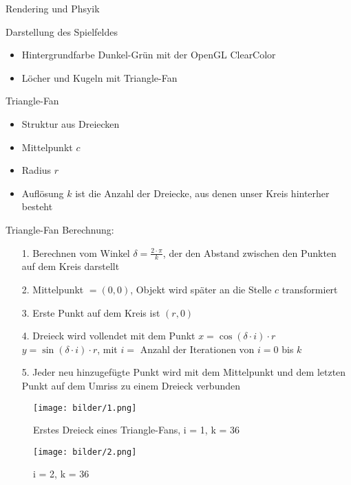 \begin{frame}{Rendering und Phsyik}
\end{frame}
\begin{frame}{Darstellung des Spielfeldes}
\begin{itemize}
	\item Hintergrundfarbe Dunkel-Grün mit der OpenGL ClearColor
	\item Löcher und Kugeln mit Triangle-Fan
\end{itemize}
\end{frame}
\begin{frame}{Triangle-Fan}
\begin{itemize}
	\item Struktur aus Dreiecken
	\item Mittelpunkt $c$
	\item Radius $r$
	\item Auflösung $k$ ist die Anzahl der Dreiecke, aus denen unser Kreis hinterher besteht
\end{itemize}
\end{frame}
\begin{frame}{Triangle-Fan}
Berechnung:
\begin{itemize}
	\item [1.] Berechnen vom Winkel $\delta = \frac{2 \cdot \pi}{k}$, der den Abstand zwischen den Punkten auf dem Kreis darstellt
	\item [2.] Mittelpunkt $= (0,0)$, Objekt wird später an die Stelle $c$ transformiert
	\item [3.] Erste Punkt auf dem Kreis ist $(r,0)$
	\item [4.] Dreieck wird vollendet mit dem Punkt $	x = \cos (\delta \cdot i) \cdot r$\\
				$y = \sin (\delta \cdot i) \cdot r$, mit $i =$ Anzahl der Iterationen von $i = 0$ bis $k$
	\item [5.] Jeder neu hinzugefügte Punkt wird mit dem Mittelpunkt und dem letzten Punkt auf dem Umriss zu einem Dreieck verbunden
\end{itemize}
\end{frame}
\begin{frame}
\begin{figure}
	\caption{Erstes Dreieck eines Triangle-Fans, i = 1, k = 36}
	\texttt{[image: bilder/1.png]}
\end{figure}
\end{frame}
\begin{frame}
\begin{figure}
	\caption{i = 2, k = 36}
	\texttt{[image: bilder/2.png]}
\end{figure}
\end{frame}
